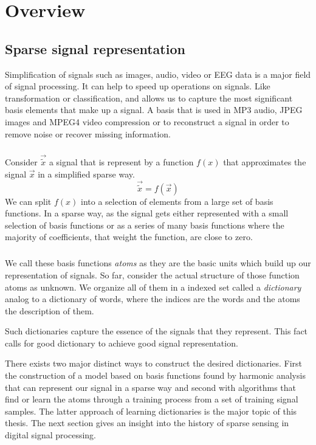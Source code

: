 \chapter{Overview}

\section{Sparse signal representation}
\label{sec:dicts}
Simplification of signals such as images, audio, video or EEG data is a major
field of signal processing. It can help to speed up operations on signals. Like
transformation or classification, and allows us to capture the most
significant basis elements that make up a signal. A basis that is
used in MP3 audio, JPEG images and MPEG4 video compression or to reconstruct
a signal in order to remove noise or recover missing information.

\paragraph{}
Consider $\vec{\tilde{x}}$ a signal that is represent by a function $f(x)$ that
approximates the signal $\vec{x}$ in a simplified sparse way.
\begin{equation*}
\vec{\tilde{x}} = f\left(\vec{x}\right)
\end{equation*}
We can split $f(x)$ into a selection of elements from a large set of
basis functions. In a sparse way, as the signal gets either represented with
a small selection of basis functions or as a series of many basis
functions where the majority of coefficients, that weight the function, are
close to zero. 

\paragraph{}
We call these basis functions \emph{atoms} as they are the basic units
which build up our representation of signals. So far, consider the actual
structure of those function atoms as unknown. We organize all of them in a
indexed set called a \emph{dictionary} analog to a dictionary of words, where
the indices are the words and the atoms the description of them. 

Such dictionaries capture the essence of the signals that they represent.
This fact calls for good dictionary to achieve good signal representation.

There exists two major distinct ways to construct the desired dictionaries. 
First the construction of a model based on basis functions found by harmonic
analysis that can represent our signal in a sparse way and second with
algorithms that find or learn the atoms through a training process from a set of
training signal samples. The latter approach of learning dictionaries is the
major topic of this thesis. The next section gives an insight into the history
of sparse sensing in digital signal processing. 



